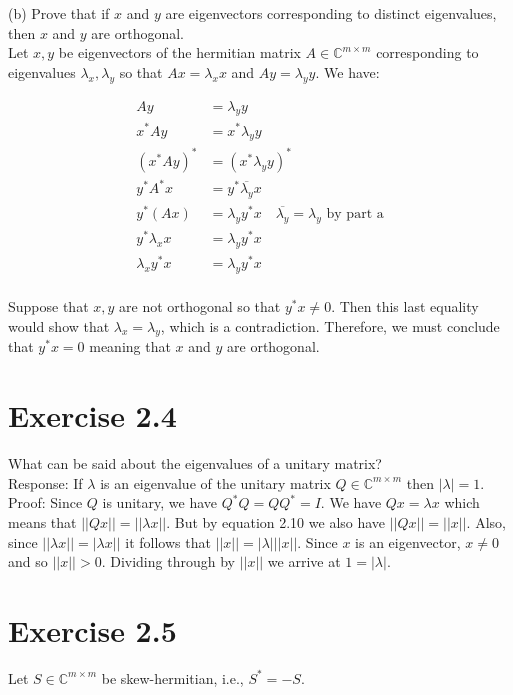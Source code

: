 \documentclass[11pt]{article}
\begin{document}
(b) Prove that if $x$ and $y$ are eigenvectors corresponding to distinct eigenvalues, then $x$ and $y$ are orthogonal. \\

Let $x,y$ be eigenvectors of the hermitian matrix $A \in \mathbb{C}^{m\times m}$ corresponding to eigenvalues $\lambda_x, \lambda_y$ so that $Ax = \lambda_x x$ and $Ay = \lambda_y y$. We have:

\begin{align*}
Ay &= \lambda_y y \\
x^*Ay &= x^*\lambda_y y \\
(x^*Ay)^* &= (x^*\lambda_y y)^*\\
y^*A^*x &= y^*\overline{\lambda_y}x\\
y^*(Ax) &= \lambda_yy^*x \quad \overline{\lambda_y} = \lambda_y \text{ by part a}\\
y^*\lambda_x x &= \lambda_y y^*x \\
\lambda_x y^* x &= \lambda_yy^*x \\
\end{align*}
 
Suppose that $x,y$ are not orthogonal so that $y^*x \neq 0$. Then this last equality would show that $\lambda_x = \lambda_y$, which is a contradiction. Therefore, we must conclude that $y^*x = 0$ meaning that $x$ and $y$ are orthogonal. 

\section*{Exercise 2.4}
What can be said about the eigenvalues of a unitary matrix?\\

Response: If $\lambda$ is an eigenvalue of the unitary matrix $Q \in \mathbb{C}^{m\times m}$ then $|\lambda | = 1$.\\

Proof: Since $Q$ is unitary, we have $Q^*Q = QQ^* = I$. We have $Qx = \lambda x$ which means that $||Qx|| = ||\lambda x||$. But by equation 2.10 we also have $||Qx||  = ||x||$. Also, since $||\lambda x|| = |\lambda x||$ it follows that $||x|| = |\lambda| ||x||$. Since $x$ is an eigenvector, $x \neq 0$ and so $||x|| >0$. Dividing through by $||x||$ we arrive at $1 = |\lambda|$. 

\section*{Exercise 2.5}
Let $S \in \mathbb{C}^{m\times m}$ be skew-hermitian, i.e., $S^* = -S$. \\
\end{document}
